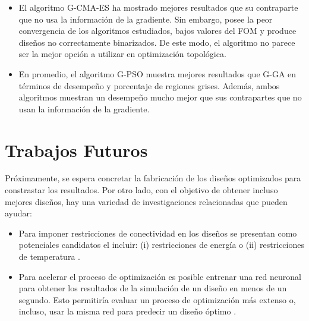 \begin{itemize}
  \item El algoritmo G-CMA-ES ha mostrado mejores resultados que su contraparte que no usa
        la información de la gradiente. Sin embargo, posee la peor convergencia de los
        algoritmos estudiados, bajos valores del FOM y 
        produce diseños no correctamente binarizados.
        De este modo, el algoritmo no parece ser la mejor opción a utilizar en optimización
        topológica. 
        
  \item En promedio, el algoritmo G-PSO muestra mejores resultados que G-GA en
        términos de desempeño y porcentaje de regiones grises.
        Además, ambos algoritmos muestran un desempeño mucho mejor
        que sus contrapartes que no usan la información de la gradiente.

\end{itemize}

\section{Trabajos Futuros}

Próximamente, se espera concretar la fabricación de los diseños optimizados para
constrastar los resultados. Por otro lado, con el objetivo de obtener incluso mejores
diseños, hay una variedad de investigaciones relacionadas que pueden ayudar:

\begin{itemize}
  \item Para imponer restricciones de conectividad en los diseños se presentan
        como potenciales candidatos el incluir:
        (i) restricciones de energía \citep{Zhang2021} o
        (ii) restricciones de temperatura \citep{Li2016}.

  \item Para acelerar el proceso de optimización es posible entrenar una
        red neuronal para obtener los resultados de la simulación de un diseño
        en menos de un segundo. Esto permitiría evaluar un proceso de optimización
        más extenso o, incluso, usar la misma red para predecir un diseño óptimo
        \citep{Liu2018, Peurifor2018}.

\end{itemize}
